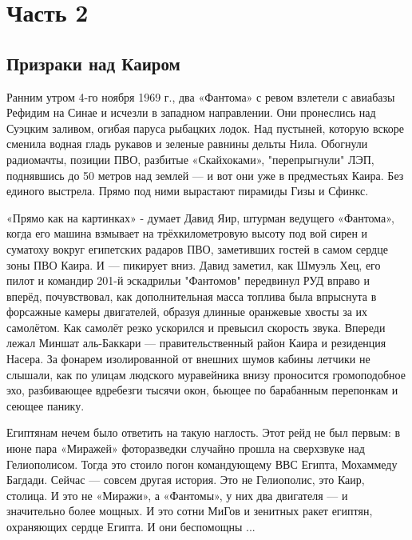 \chapter{Часть 2}

\section{Призраки над Каиром}

Ранним утром 4-го ноября 1969 г., два «Фантома» с ревом взлетели с авиабазы Рефидим на Синае и исчезли в западном направлении. Они пронеслись над Суэцким заливом, огибая паруса рыбацких лодок. Над пустыней, которую вскоре сменила водная гладь рукавов и зеленые равнины дельты Нила. Обогнули радиомачты, позиции ПВО, разбитые «Скайхоками», "перепрыгнули" ЛЭП, поднявшись до 50 метров над землей — и вот они уже в предместьях Каира. Без единого выстрела. Прямо под ними вырастают пирамиды Гизы и Сфинкс.

«Прямо как на картинках» - думает Давид Яир, штурман ведущего «Фантома», когда его машина взмывает на трёхкилометровую высоту под вой сирен и суматоху вокруг египетских радаров ПВО, заметивших гостей в самом сердце зоны ПВО Каира. И — пикирует вниз. Давид заметил, как Шмуэль Хец, его пилот и командир 201-й эскадрильи "Фантомов" передвинул РУД вправо и вперёд, почувствовал, как дополнительная масса топлива была впрыснута в форсажные камеры двигателей, образуя длинные оранжевые хвосты за их самолётом. Как самолёт резко ускорился и превысил скорость звука. Впереди лежал Миншат аль-Баккари — правительственный район Каира и резиденция Насера. За фонарем изолированной от внешних шумов кабины летчики не слышали, как по улицам людского муравейника внизу проносится громоподобное эхо, разбивающее вдребезги тысячи окон, бьющее по барабанным перепонкам и сеющее панику.

Египтянам нечем было ответить на такую наглость. Этот рейд не был первым: в июне пара «Миражей» фоторазведки случайно прошла на сверхзвуке над Гелиополисом. Тогда это стоило погон командующему ВВС Египта, Мохаммеду Багдади. Сейчас — совсем другая история. Это не Гелиополис, это Каир, столица. И это не «Миражи», а «Фантомы», у них два двигателя — и значительно более мощных. И это сотни МиГов и зенитных ракет египтян, охраняющих сердце Египта. И они беспомощны ...

